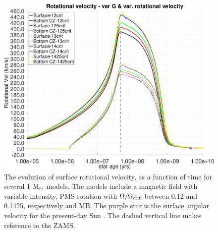 \documentclass[fleqn,usenatbib]{mnras}
\begin{document}
\begin{figure}
	\includegraphics[clip,width=\columnwidth]{figures/paper2/rot_vel_var_vel_var_g3.pdf}
    \caption{The evolution of surface rotational velocity, as a function of time for several 1 $\mathrm{M}_\odot$ models. The models include a magnetic field with variable intensity, PMS rotation with $\Omega / \Omega_{\mathrm{crit}}$ between 0.12 and 0.1425, respectively and MB. The purple star is the surface angular velocity for the present-day Sun \citep{Gill2012}. The dashed vertical line makes reference to the ZAMS.}
    \label{fig:rot_vel_var_vel_var_g3}
\end{figure}
\end{document}
